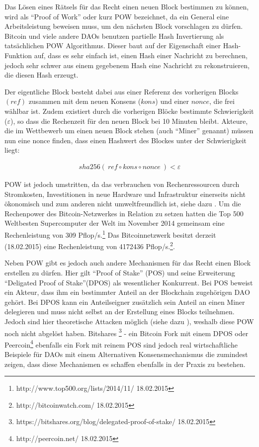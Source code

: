 \documentclass[a4paper,12pt]{report}
\begin{document}
Das Lösen eines Rätsels für das Recht einen neuen Block bestimmen zu können, wird als ``Proof of Work'' oder kurz POW bezeichnet, da ein General eine Arbeitsleistung beweisen muss, um den nächsten Block vorschlagen zu dürfen. Bitcoin und viele andere DAOs benutzen partielle Hash Invertierung als tatsächlichen POW Algorithmus. Dieser baut auf der Eigenschaft einer Hash-Funktion auf, dass es sehr einfach ist, einen Hash einer Nachricht zu berechnen, jedoch sehr schwer aus einem gegebenem Hash eine Nachricht zu rekonstruieren, die diesen Hash erzeugt. 

Der eigentliche Block besteht dabei aus einer Referenz des vorherigen Blocks $(ref)$ zusammen mit dem neuen Konsens ($kons$) und einer $nonce$, die frei wählbar ist. Zudem existiert durch die vorherigen Blöcke bestimmte Schwierigkeit ($\varepsilon$), so dass die Rechenzeit für den neuen Block bei 10 Minuten bleibt. Akteure, die im Wettbewerb um einen neuen Block stehen (auch ``Miner'' genannt) müssen nun eine nonce finden, dass einen Hashwert des Blockes unter der Schwierigkeit liegt:

\begin{eqnarray}
   sha256(\ ref\circ kons\circ nonce\ ) < \varepsilon
\end{eqnarray}

POW ist jedoch umstritten, da das verbrauchen von Rechenressourcen durch Stromkosten, Investitionen in neue Hardware und Infrastruktur einerseits nicht ökonomisch und zum anderen nicht umweltfreundlich ist, siehe dazu \cite{Becker2011a}. Um die Rechenpower des Bitcoin-Netzwerkes in Relation zu setzen hatten die Top 500 Weltbesten Supercomputer der Welt im November 2014 gemeinsam eine Rechenleistung von 309 Pflop/s.\footnote{http://www.top500.org/lists/2014/11/ 18.02.2015} Das Bitcoinnetzwerk besitzt derzeit (18.02.2015) eine Rechenleistung von 4172436 Pflop/s.\footnote{http://bitcoinwatch.com/ 18.02.2015}.


Neben POW gibt es jedoch auch andere Mechanismen für das Recht einen Block erstellen zu dürfen. Hier gilt ``Proof of Stake'' (POS) und seine Erweiterung ``Deligated Proof of Stake''(DPOS) als wesentlicher Konkurrent. Bei POS beweist ein Akteur, dass ihm ein bestimmter Anteil an der Blockchain zugehörigen DAO gehört. Bei  DPOS kann ein Anteilseigner zusätzlich sein Anteil an einen Miner delegieren und muss nicht selbst an der Erstellung eines Blocks teilnehmen. Jedoch sind hier theoretische Attacken möglich (siehe dazu \cite{EthereumBlogPOS} \cite{Vasant2015}), weshalb diese POW noch nicht abgelöst haben. Bitshares \footnote{https://bitshares.org/blog/delegated-proof-of-stake/ 18.02.2015} - ein Bitcoin Fork mit einem DPOS oder Peercoin\footnote{http://peercoin.net/ 18.02.2015} ebenfalls ein Fork mit reinem POS sind jedoch real wirtschaftliche Beispiele für DAOs mit einem Alternativen Konsensmechanismus die zumindest zeigen, dass diese Mechanismen es schaffen ebenfalls in der Praxis zu bestehen.
\end{document}
